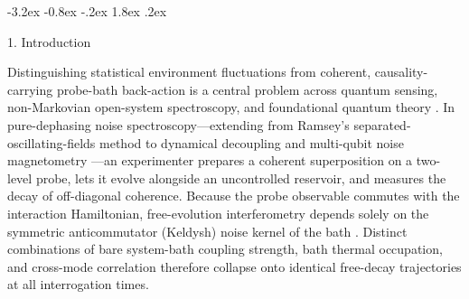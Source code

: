 \documentclass[11pt,letterpaper]{article}
\makeatletter
\renewcommand\section{\@startsection{section}{1}{\z@}%
  {-3.2ex \@plus -0.8ex \@minus -.2ex}%
  {1.8ex \@plus .2ex}%
  {\normalfont\Large\bfseries\raggedright\hyphenpenalty=10000}}
\theoremstyle{definition}
\makeatother
\begin{document}
\vspace{6pt}
\vspace{10pt}

\section{1. Introduction}\label{introduction}

Distinguishing statistical environment fluctuations from coherent,
causality-carrying probe-bath back-action is a central problem across
quantum sensing, non-Markovian open-system spectroscopy, and
foundational quantum theory
\citep{breuerPetruccione2002, weiss2012, rivas2014, breuer2016, degen2017}.
In pure-dephasing noise spectroscopy---extending from Ramsey's
separated-oscillating-fields method \citep{ramsey1950} to dynamical
decoupling and multi-qubit noise magnetometry
\citep{alvarezSuter2011, bylander2011, pazSilvaViola2014, szankowski2016, szankowski2017, pazSilva2017, pazSilva2019, smirne2016, chalermpusitarak2021}---an
experimenter prepares a coherent superposition on a two-level probe,
lets it evolve alongside an uncontrolled reservoir, and measures the
decay of off-diagonal coherence. Because the probe observable commutes
with the interaction Hamiltonian, free-evolution interferometry depends
solely on the symmetric anticommutator (Keldysh) noise kernel of the
bath
\citep{feynmanVernon1963, caldeiraLeggett1983, leggett1987, huPazZhang1992, luczka1990, palma1996, reina2002, zurek2003, clerk2010}.
Distinct combinations of bare system-bath coupling strength, bath
thermal occupation, and cross-mode correlation therefore collapse onto
identical free-decay trajectories at all interrogation times.
\end{document}
